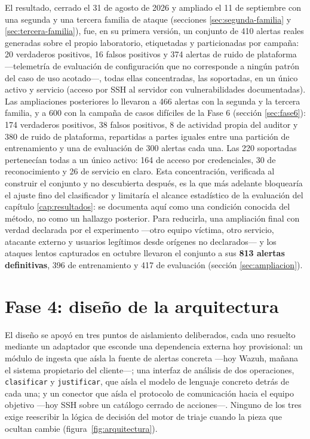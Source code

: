 El resultado, cerrado el 31 de agosto de 2026 y ampliado el 11 de septiembre con una segunda y
una tercera familia de ataque (secciones \ref{sec:segunda-familia} y \ref{sec:tercera-familia}),
fue, en su primera versión, un conjunto de 410 alertas reales generadas sobre el propio
laboratorio, etiquetadas y particionadas por campaña: 20 verdaderos positivos, 16 falsos positivos
y 374 alertas de ruido de plataforma ---telemetría de evaluación de configuración que no
corresponde a ningún patrón del caso de uso acotado---, todas ellas concentradas, las soportadas,
en un único activo y servicio (acceso por SSH al servidor con vulnerabilidades documentadas). Las
ampliaciones posteriores lo llevaron a 466 alertas con la segunda y la tercera familia, y a 600
con la campaña de casos difíciles de la Fase 6 (sección \ref{sec:fase6}): 174 verdaderos positivos,
38 falsos positivos, 8 de actividad propia del auditor y 380 de ruido de plataforma, repartidas a
partes iguales entre una partición de entrenamiento y una de evaluación de 300 alertas cada una.
Las 220 soportadas pertenecían todas a un único activo: 164 de acceso por credenciales, 30 de
reconocimiento y 26 de servicio en claro. Esta concentración, verificada al construir el conjunto y
no descubierta después, es la que más adelante bloquearía el ajuste fino del clasificador y
limitaría el alcance estadístico de la evaluación del capítulo \ref{cap:resultados}: se documenta
aquí como una condición conocida del método, no como un hallazgo posterior. Para reducirla, una
ampliación final con verdad declarada por el experimento ---otro equipo víctima, otro servicio,
atacante externo y usuarios legítimos desde orígenes no declarados--- y los ataques lentos
capturados en octubre llevaron el conjunto a sus \textbf{813 alertas definitivas}, 396 de
entrenamiento y 417 de evaluación (sección \ref{sec:ampliacion}).

\section{Fase 4: diseño de la arquitectura}

El diseño se apoyó en tres puntos de aislamiento deliberados, cada uno resuelto mediante un
adaptador que esconde una dependencia externa hoy provisional: un módulo de ingesta que aísla la
fuente de alertas concreta ---hoy Wazuh, mañana el sistema propietario del cliente---; una interfaz de
análisis de dos operaciones, \texttt{clasificar} y \texttt{justificar}, que aísla el modelo de
lenguaje concreto detrás de cada una; y un conector que aísla el protocolo de comunicación hacia el
equipo objetivo ---hoy SSH sobre un catálogo cerrado de acciones---. Ninguno de los tres exige
reescribir la lógica de decisión del motor de triaje cuando la pieza que ocultan cambie
(figura~\ref{fig:arquitectura}).

